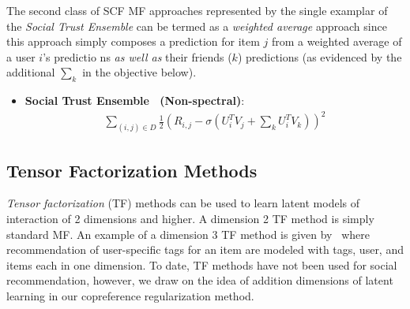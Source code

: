 The second class of SCF MF approaches represented by the single
examplar of the {\it Social Trust Ensemble} can be termed as a
\emph{weighted average} approach since this approach simply composes a
prediction for item $j$ from a weighted average of a user $i$'s
predictio
ns \emph{as well as} their friends ($k$) predictions (as
evidenced by the additional $\sum_k$ in the objective below).

\begin{itemize}
\item {\bf Social Trust Ensemble~\cite{ste} (Non-spectral)}:
\begin{align}
\sum_{(i,j) \in D} \frac{1}{2} (R_{i,j} - \sigma (U_i^T V_j + \sum_k U_i^T V_k))^2 \nonumber
\end{align}
\end{itemize}

\subsection{Tensor Factorization Methods}


\emph{Tensor factorization} (TF) methods can be used to learn latent
models of interaction of 2 dimensions and higher.  A dimension 2 TF
method is simply standard MF.  An example of a dimension 3 TF method
is given by~\cite{tf} where recommendation of user-specific tags for
an item are modeled with tags, user, and items each in one dimension.
To date, TF methods have not been used for social recommendation,
however, we draw on the idea of addition dimensions of latent learning
in our copreference regularization method.


